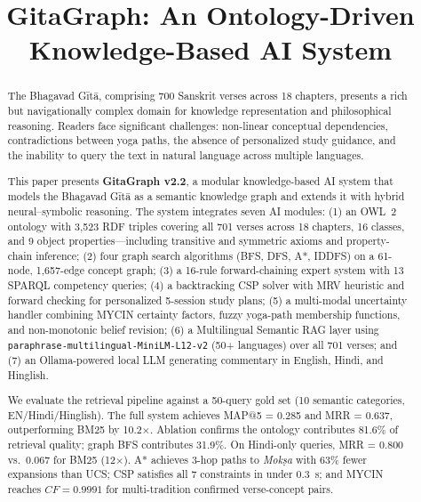 \documentclass[conference]{IEEEtran}
\begin{document}
\title{GitaGraph: An Ontology-Driven Knowledge-Based AI System}

\author{
}

\maketitle

\begin{abstract}
The Bhagavad G\={i}t\={a}, comprising 700 Sanskrit verses across 18 chapters,
presents a rich but navigationally complex domain for knowledge representation
and philosophical reasoning. Readers face significant challenges: non-linear
conceptual dependencies, contradictions between yoga paths, the absence of
personalized study guidance, and the inability to query the text in natural
language across multiple languages.

This paper presents \textbf{GitaGraph v2.2}, a modular knowledge-based AI
system that models the Bhagavad G\={i}t\={a} as a semantic knowledge graph
and extends it with hybrid neural--symbolic reasoning. The system integrates
seven AI modules: (1) an OWL~2 ontology with 3,523 RDF triples covering all
701 verses across 18 chapters, 16 classes, and 9 object properties—including
transitive and symmetric axioms and property-chain inference; (2) four graph
search algorithms (BFS, DFS, A*, IDDFS) on a 61-node, 1,657-edge concept graph;
(3) a 16-rule forward-chaining expert system with 13 SPARQL competency queries;
(4) a backtracking CSP solver with MRV heuristic and forward checking for
personalized 5-session study plans; (5) a multi-modal uncertainty handler
combining MYCIN certainty factors, fuzzy yoga-path membership functions, and
non-monotonic belief revision; (6) a Multilingual Semantic RAG layer using
\texttt{paraphrase-multilingual-MiniLM-L12-v2} (50+ languages) over all 701
verses; and (7) an Ollama-powered local LLM generating commentary in English,
Hindi, and Hinglish.

We evaluate the retrieval pipeline against a 50-query gold set (10 semantic
categories, EN/Hindi/Hinglish). The full system achieves MAP@5 = 0.285 and
MRR = 0.637, outperforming BM25 by 10.2$\times$. Ablation confirms the
ontology contributes 81.6\% of retrieval quality; graph BFS contributes 31.9\%.
On Hindi-only queries, MRR = 0.800 vs.\ 0.067 for BM25 (12$\times$).
A* achieves 3-hop paths to \textit{Mok\d{s}a} with 63\% fewer expansions than
UCS; CSP satisfies all 7 constraints in under 0.3~s; and MYCIN reaches
$CF = 0.9991$ for multi-tradition confirmed verse-concept pairs.
\end{abstract}
\end{document}
